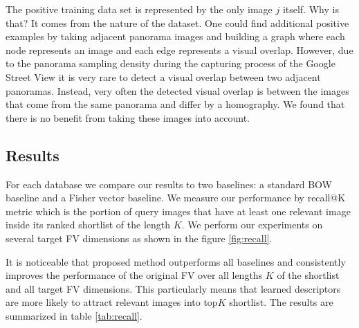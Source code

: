 \documentclass[table]{article} %
\begin{document}
      	The positive training data set is represented by the only image $j$ itself. Why is that? It comes from the nature of the dataset. One could find additional positive examples by taking adjacent panorama images and building a graph where each node represents an image and each edge represents a visual overlap. However, due to the panorama sampling density during the capturing process of the Google Street View it is very rare to detect a visual overlap between two adjacent panoramas. Instead, very often the detected visual overlap is between the images that come from the same panorama and differ by a homography. We found that there is no benefit from taking these images into account.



	\subsection{Results}
		For each database we compare our results to two baselines: a standard BOW baseline and a Fisher vector baseline. We measure our performance by recall@K metric which is the portion of query images that have at least one relevant image inside its ranked shortlist of the length $K$. We perform our experiments on several target FV dimensions as shown in the figure \ref{fig:recall}.

		It is noticeable that proposed method outperforms all baselines and consistently improves the performance of the original FV over all lengths $K$ of the shortlist and all target FV dimensions. This particularly means that learned descriptors are more likely to attract relevant images into top$K$ shortlist. The results are summarized in table \ref{tab:recall}.
\end{document}
